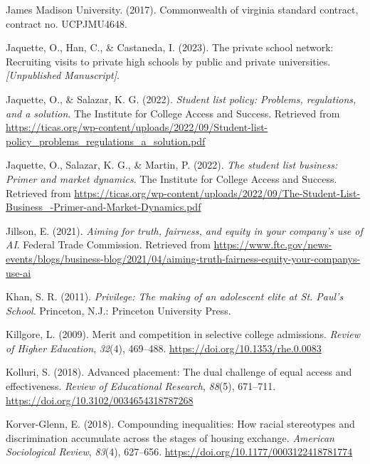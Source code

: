 \documentclass[
  12pt,
]{article}
\newlength{\cslhangindent}
\newlength{\cslentryspacingunit} %
\newenvironment{CSLReferences}[2] %
 {%
  \setlength{\parindent}{0pt}
  \ifodd #1
  \let\oldpar\par
  \def\par{\hangindent=\cslhangindent\oldpar}
  \fi
  \setlength{\parskip}{#2\cslentryspacingunit}
 }%
 {}
\begin{document}
\begin{CSLReferences}{1}{0}
\leavevmode{}%
James Madison University. (2017). Commonwealth of virginia standard contract, contract no. UCPJMU4648.

\leavevmode{}%
Jaquette, O., Han, C., \& Castaneda, I. (2023). The private school network: Recruiting visits to private high schools by public and private universities. \emph{{{[}Unpublished Manuscript{]}}}.

\leavevmode{}%
Jaquette, O., \& Salazar, K. G. (2022). \emph{Student list policy: Problems, regulations, and a solution}. {The Institute for College Access and Success}. Retrieved from \url{https://ticas.org/wp-content/uploads/2022/09/Student-list-policy_problems_regulations_a_solution.pdf}

\leavevmode{}%
Jaquette, O., Salazar, K. G., \& Martin, P. (2022). \emph{The student list business: Primer and market dynamics}. {The Institute for College Access and Success}. Retrieved from \url{https://ticas.org/wp-content/uploads/2022/09/The-Student-List-Business_-Primer-and-Market-Dynamics.pdf}

\leavevmode{}%
Jillson, E. (2021). \emph{Aiming for truth, fairness, and equity in your company's use of AI}. Federal Trade Commission. Retrieved from \url{https://www.ftc.gov/news-events/blogs/business-blog/2021/04/aiming-truth-fairness-equity-your-companys-use-ai}

\leavevmode{}%
Khan, S. R. (2011). \emph{Privilege: The making of an adolescent elite at {St. Paul's School}}. Princeton, N.J.: Princeton University Press.

\leavevmode{}%
Killgore, L. (2009). Merit and competition in selective college admissions. \emph{Review of Higher Education}, \emph{32}(4), 469--488. \url{https://doi.org/10.1353/rhe.0.0083}

\leavevmode{}%
Kolluri, S. (2018). Advanced placement: The dual challenge of equal access and effectiveness. \emph{Review of Educational Research}, \emph{88}(5), 671--711. \url{https://doi.org/10.3102/0034654318787268}

\leavevmode{}%
Korver-Glenn, E. (2018). Compounding inequalities: How racial stereotypes and discrimination accumulate across the stages of housing exchange. \emph{American Sociological Review}, \emph{83}(4), 627--656. \url{https://doi.org/10.1177/0003122418781774}


\end{CSLReferences}
\end{document}
